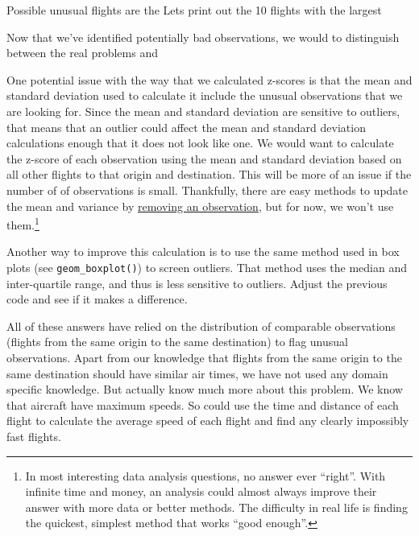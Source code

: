 \documentclass[]{book}
\newenvironment{Shaded}{\begin{snugshade}}{\end{snugshade}}
\newcommand{\CommentTok}[1]{\textcolor[rgb]{0.56,0.35,0.01}{\textit{#1}}}
\newcommand{\DataTypeTok}[1]{\textcolor[rgb]{0.13,0.29,0.53}{#1}}
\newcommand{\DecValTok}[1]{\textcolor[rgb]{0.00,0.00,0.81}{#1}}
\newcommand{\KeywordTok}[1]{\textcolor[rgb]{0.13,0.29,0.53}{\textbf{#1}}}
\newcommand{\NormalTok}[1]{#1}
\newcommand{\OperatorTok}[1]{\textcolor[rgb]{0.81,0.36,0.00}{\textbf{#1}}}
\newcommand{\StringTok}[1]{\textcolor[rgb]{0.31,0.60,0.02}{#1}}
\let\rmarkdownfootnote\footnote%
\def\footnote{\protect\rmarkdownfootnote}
\theoremstyle{plain}
\theoremstyle{remark}
\begin{document}
Possible unusual flights are the Lets print out the 10 flights with the
largest

\begin{Shaded}
\end{Shaded}

Now that we've identified potentially bad observations, we would to
distinguish between the real problems and

One potential issue with the way that we calculated z-scores is that the
mean and standard deviation used to calculate it include the unusual
observations that we are looking for. Since the mean and standard
deviation are sensitive to outliers, that means that an outlier could
affect the mean and standard deviation calculations enough that it does
not look like one. We would want to calculate the z-score of each
observation using the mean and standard deviation based on all other
flights to that origin and destination. This will be more of an issue if
the number of of observations is small. Thankfully, there are easy
methods to update the mean and variance by
\href{https://en.wikipedia.org/wiki/Algorithms_for_calculating_variance}{removing
an observation}, but for now, we won't use them.\footnote{In most
  interesting data analysis questions, no answer ever ``right''. With
  infinite time and money, an analysis could almost always improve their
  answer with more data or better methods. The difficulty in real life
  is finding the quickest, simplest method that works ``good enough''.}

Another way to improve this calculation is to use the same method used
in box plots (see \texttt{geom\_boxplot()}) to screen outliers. That
method uses the median and inter-quartile range, and thus is less
sensitive to outliers. Adjust the previous code and see if it makes a
difference.

All of these answers have relied on the distribution of comparable
observations (flights from the same origin to the same destination) to
flag unusual observations. Apart from our knowledge that flights from
the same origin to the same destination should have similar air times,
we have not used any domain specific knowledge. But actually know much
more about this problem. We know that aircraft have maximum speeds. So
could use the time and distance of each flight to calculate the average
speed of each flight and find any clearly impossibly fast flights.
\end{document}
